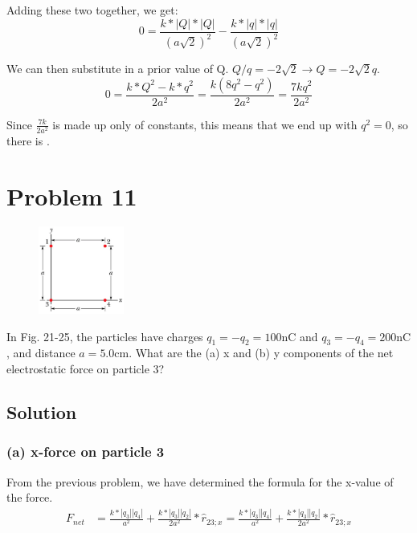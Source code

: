 \documentclass[12pt]{article}
\begin{document}
Adding these two together, we get:
\begin{equation}
    0 = \frac{k*|Q|*|Q|}{(a\sqrt{2})^2} - \frac{k*|q|*|q|}{(a\sqrt{2})^2}
\end{equation}

We can then substitute in a prior value of Q. $Q/q = -2\sqrt{2} \rightarrow Q = -2\sqrt{2}q$. 
\begin{equation}
    0 = \frac{k*Q^2 - k*q^2}{2a^2} = \frac{k(8q^2 - q^2)}{2a^2} = \frac{7kq^2}{2a^2}
\end{equation}

Since $\frac{7k}{2a^2}$ is made up only of constants, this means that we end up with $q^2 = 0$, so there is .


\pagebreak
\section*{Problem 11}
\begin{figure}
    \vspace{-30pt}
    \includegraphics[width=0.25\textwidth]{picture_4.png} 
\end{figure}
In Fig. 21-25, the particles have charges $q_1 = -q_2 = 100 \unit{\nano\coulomb}$ and $q_3 = -q_4 = 200 \unit{\nano\coulomb}$, and distance $a = 5.0\unit{\centi\meter}$. What are the (a) x and (b) y components of the net electrostatic force on particle 3?

\subsection*{Solution}
\subsubsection*{(a) x-force on particle 3}
From the previous problem, we have determined the formula for the x-value of the force.
\begin{align*}
    F_{net} &=  \frac{k*|q_3||q_4|}{a^2} + \frac{k*|q_3||q_2|}{2a^2}*\hat{r}_{23;x}
            =   \frac{k*|q_3||q_4|}{a^2} + \frac{k*|q_3||q_2|}{2a^2}*\hat{r}_{23;x}
\end{align*}
\end{document}
